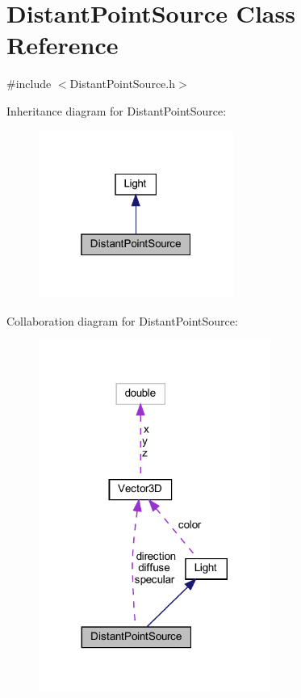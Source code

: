 \hypertarget{classDistantPointSource}{}\section{Distant\+Point\+Source Class Reference}
\label{classDistantPointSource}


{\ttfamily \#include $<$Distant\+Point\+Source.\+h$>$}



Inheritance diagram for Distant\+Point\+Source\+:
\nopagebreak
\begin{figure}[H]
\begin{center}
\leavevmode
\includegraphics[width=181pt]{classDistantPointSource__inherit__graph}
\end{center}
\end{figure}


Collaboration diagram for Distant\+Point\+Source\+:
\nopagebreak
\begin{figure}[H]
\begin{center}
\leavevmode
\includegraphics[width=215pt]{classDistantPointSource__coll__graph}
\end{center}
\end{figure}
